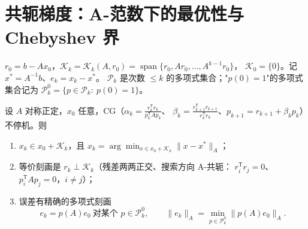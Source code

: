 \section{共轭梯度：A-范数下的最优性与 Chebyshev 界}

\begin{definition}
$r_0=b-Ax_0$，$\mathcal K_k=\mathcal K_k(A,r_0)=\operatorname{span}\{r_0,Ar_0,\dots,A^{k-1}r_0\}$，
$\mathcal K_0=\{0\}$。记 $x^\ast=A^{-1}b$、$e_k=x_k-x^\ast$。
$\mathcal P_k$ 是次数 $\le k$ 的多项式集合；"$p(0)=1$"的多项式集合记为
$\mathcal P_k^0=\{p\in\mathcal P_k:\ p(0)=1\}$。
\end{definition}

\begin{theorem}[CG 的最优性与误差多项式]
\label{thm:cg-optimal}
设 $A$ 对称正定，$x_0$ 任意，CG（$\alpha_k=\frac{r_k^{\mathsf T}r_k}{p_k^{\mathsf T}Ap_k}$、
$\beta_k=\frac{r_{k+1}^{\mathsf T}r_{k+1}}{r_k^{\mathsf T}r_k}$、$p_{k+1}=r_{k+1}+\beta_kp_k$）不停机。则
\begin{enumerate}
  \item $x_k\in x_0+\mathcal K_k$，且
        $x_k=\arg\min_{x\in x_0+\mathcal K_k}\|x-x^\ast\|_A$；
  \item 等价刻画是 $r_k\perp\mathcal K_k$（残差两两正交、搜索方向 A-共轭：
        $r_i^{\mathsf T}r_j=0$、$p_i^{\mathsf T}Ap_j=0$，$i\ne j$）；
  \item 误差有精确的多项式刻画
        \begin{equation}
          e_k=p(A)e_0\ \text{对某个 }p\in\mathcal P_k^0,
          \qquad
          \|e_k\|_A=\min_{p\in\mathcal P_k^0}\|p(A)e_0\|_A .
          \label{eq:cg-poly}
        \end{equation}
\end{enumerate}
\end{theorem}

